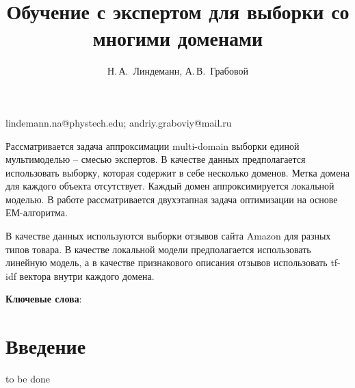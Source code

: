 \documentclass[12pt, twoside]{article}
\begin{document}
\title
    {Обучение с экспертом для выборки со многими доменами} %
\author
    {Н.\,А.~Линдеманн, А.\,В.~Грабовой} %
\email
    {lindemann.na@phystech.edu; andriy.graboviy@mail.ru}
\abstract
    {
    
Рассматривается задача аппроксимации multi-domain выборки единой мультимоделью -- смесью экспертов. В качестве данных предполагается использовать выборку, которая содержит в себе несколько доменов. Метка домена для каждого объекта отсутствует. Каждый домен аппроксимируется локальной моделью. В работе рассматривается двухэтапная задача оптимизации на основе ЕМ-алгоритма.
    
В качестве данных используются выборки отзывов сайта Amazon для разных типов товара. В качестве локальной модели предполагается использовать линейную модель, а в качестве признакового описания отзывов использовать tf-idf вектора внутри каждого домена.
	
\bigskip
\noindent
\textbf{Ключевые слова}: \emph {}

}


\maketitle
\linenumbers

\section{Введение}
to be done
\end{document}
